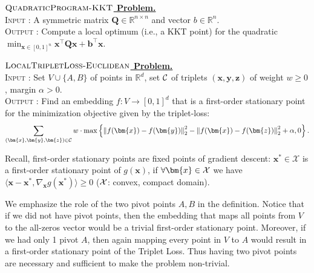 \documentclass{article}
\theoremstyle{definition}  %
\theoremstyle{plain}
\numberwithin{observation}{section}
\numberwithin{claim}{section}
\numberwithin{fact}{section}
\numberwithin{lemma}{section}
\numberwithin{proposition}{section}
\numberwithin{theorem}{section}
\numberwithin{corollary}{section}
\numberwithin{definition}{section}
\def\vb{{\bm{b}}}
\def\vx{{\bm{x}}}
\def\vy{{\bm{y}}}
\def\vz{{\bm{z}}}
\newcommand{\calX}{\ensuremath{\mathcal{X}}}
\newcommand{\norm}[1]{\left\| #1 \right\|}
\newcommand{\mat}[1]{\mathbf{#1}}
\newcommand{\CLS}{\mathsf{CLS}}
\newenvironment{nproblem}[1][\unskip]{%
  \medskip
  \begin{mdframed}
  \noindent
  \textbf{\underline{$#1$ Problem.}} \\
  \noindent
}{%
  \end{mdframed}
  \medskip %
}
\theoremstyle{plain}
\begin{document}



\begin{nproblem}[\textsc{QuadraticProgram-KKT}] \label{def:quadratic}
\textsc{Input :} A symmetric matrix $\mat{Q} \in \mathbb{R}^{n \times n}$ and vector $b\in \mathbb{R}^{n}$.
\\
  \noindent \textsc{Output :} Compute a local optimum (i.e., a KKT point) for the quadratic $\min_{\vx \in [0, 1]^n} \vx^\top \mat{Q} \vx + \vb^\top \vx$.
    
\end{nproblem} 



\begin{nproblem}[\textsc{LocalTripletLoss-Euclidean}] \label{def:local-loss}
\textsc{Input :} Set $V\cup\{A,B\}$ of points in $\mathbb{R}^d$, set $\cal{C}$ of triplets $(\vx, \vy, \vz)$ of weight $w \ge 0$, margin $\alpha>0$.
\\
  \noindent \textsc{Output :}  Find an embedding $f: V \to [0,1]^d$ that is a first-order stationary point for the minimization objective given by the triplet-loss:\[\sum_{(\vx, \vy, \vz)\in \cal{C}} w \cdot \max \left\{\norm{f(\vx) - f(\vy)}_2^2 - \norm{f(\vx) - f(\vz)}_2^2 + \alpha, 0\right\}.\] 
\end{nproblem}

Recall, first-order stationary points are fixed points of gradient descent: $\vx^* \in \calX$ is a first-order stationary point of $g(\vx)$, if $\forall \vx \in \cal{X}$ we have $\langle\vx - \vx^*, \nabla_{\vx} g(\vx^*)\rangle \geq 0$ ($\cal{X}$: convex, compact domain). 

We emphasize the role of the two pivot points $A,B$ in the definition. Notice that if we did not have pivot points, then the embedding that maps all points from $V$ to the all-zeros vector would be a trivial first-order stationary point. Moreover, if we had only 1 pivot $A$, then again mapping every point in $V$ to $A$ would result in a first-order stationary point of the Triplet Loss. Thus having two pivot points are necessary and sufficient to make the problem non-trivial.
\end{document}
